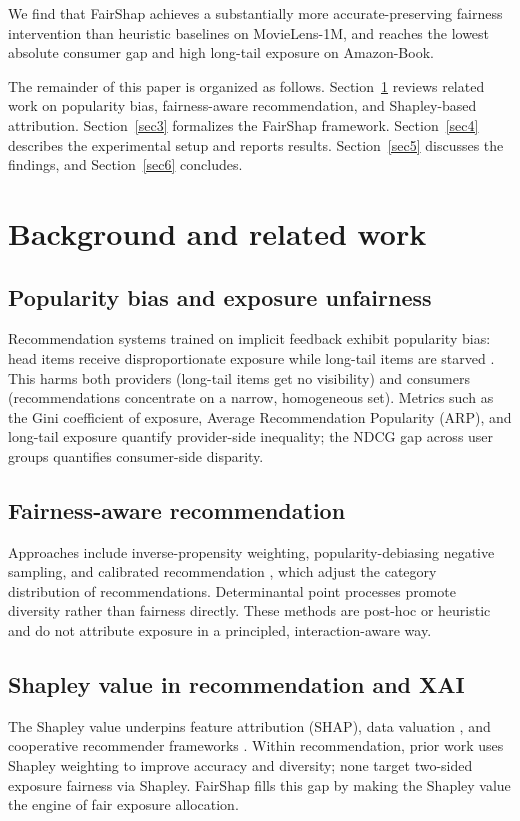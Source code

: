 \documentclass[pdflatex,sn-mathphys-num]{sn-jnl}%
\theoremstyle{thmstyleone}%
\theoremstyle{thmstyletwo}%
\theoremstyle{thmstylethree}%
\begin{document}
We find that FairShap achieves a substantially more accurate-preserving fairness intervention than heuristic baselines on MovieLens-1M, and reaches the lowest absolute consumer gap and high long-tail exposure on Amazon-Book.

The remainder of this paper is organized as follows. Section~\ref{sec2} reviews related work on popularity bias, fairness-aware recommendation, and Shapley-based attribution. Section~\ref{sec3} formalizes the FairShap framework. Section~\ref{sec4} describes the experimental setup and reports results. Section~\ref{sec5} discusses the findings, and Section~\ref{sec6} concludes.

\section{Background and related work}\label{sec2}

\subsection{Popularity bias and exposure unfairness}
Recommendation systems trained on implicit feedback exhibit popularity bias: head items receive disproportionate exposure while long-tail items are starved \cite{abdollahpouri2019popularity}. This harms both providers (long-tail items get no visibility) and consumers (recommendations concentrate on a narrow, homogeneous set). Metrics such as the Gini coefficient of exposure, Average Recommendation Popularity (ARP), and long-tail exposure quantify provider-side inequality; the NDCG gap across user groups quantifies consumer-side disparity.

\subsection{Fairness-aware recommendation}
Approaches include inverse-propensity weighting, popularity-debiasing negative sampling, and calibrated recommendation \cite{steck2018calibrated}, which adjust the category distribution of recommendations. Determinantal point processes \cite{li2017dpp} promote diversity rather than fairness directly. These methods are post-hoc or heuristic and do not attribute exposure in a principled, interaction-aware way.

\subsection{Shapley value in recommendation and XAI}
The Shapley value \cite{shapley1953} underpins feature attribution (SHAP), data valuation \cite{ghorbani2019datashapley}, and cooperative recommender frameworks \cite{louhichi2026dyhucog}. Within recommendation, prior work uses Shapley weighting to improve accuracy and diversity; none target two-sided exposure fairness via Shapley. FairShap fills this gap by making the Shapley value the engine of fair exposure allocation.
\end{document}

